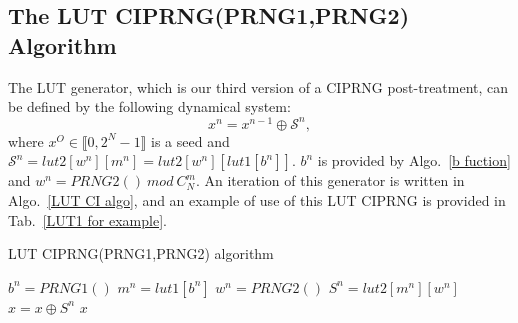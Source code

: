 \subsection{The LUT CIPRNG(PRNG1,PRNG2) Algorithm}

The LUT generator, which is our third version of a CIPRNG post-treatment, 
can be defined by the following dynamical system:
\begin{equation}
x^n = x^{n-1} \oplus \mathcal{S}^n,
\end{equation}
where $x^O\in \llbracket 0,2^N-1\rrbracket$ is a seed and $\mathcal{S}^n = lut2[w^n][m^n] = lut2[w^n][lut1[b^n]]$.
$b^n$ is provided by Algo.~\ref{b fuction} and $w^n=PRNG2()~mod~C^m_N$.
An iteration of this generator is written in Algo.~\ref{LUT CI algo},
and an example of use of this LUT CIPRNG is provided in Tab.~\ref{LUT1 for example}.
 \begin{algorithm}
 \caption{LUT CIPRNG(PRNG1,PRNG2) algorithm}\label{LUT CI algo}
 \begin{algorithmic}[1]
  \STATE $b^n = PRNG1()$
    \STATE $m^n = lut1[b^n]$
    \STATE $w^n = PRNG2()$
    \STATE $S^n = lut2[m^n][w^n]$
    \STATE $x = x \oplus S^n$
    \RETURN $x$
 \end{algorithmic}
 \end{algorithm}




